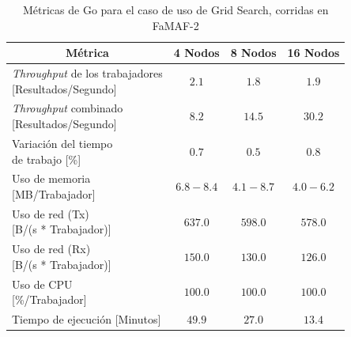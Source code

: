 \documentclass[11pt]{article}
\providecommand{\row}[1]{\parbox{150pt}{\setlength{\baselineskip}{0.2\baselineskip}\strut#1\strut}}
\newcommand{\gscap}[2]{\caption{Métricas de #1 para el caso de uso de Grid Search, corridas en #2}}
\newcommand{\english}[1]{\textit{#1}}
\begin{document}
\begin{table}[H]
\centering
\begin{tabular}{|l|c|c|c|}
\hline
\multicolumn{1}{|c|}{Métrica} & 4 Nodos & 8 Nodos & 16 Nodos \\ \hline
\row{\english{Throughput} de los trabajadores\\{[Resultados/Segundo]}} & $2.1$ & $1.8$ & $1.9$ \\ \hline
\row{\english{Throughput} combinado\\{[Resultados/Segundo]}} & $8.2$ & $14.5$ & $30.2$ \\ \hline
\row{Variación del tiempo\\de trabajo {[\%]}} & $0.7$ & $0.5$ & $0.8$ \\ \hline
\row{Uso de memoria\\{[MB/Trabajador]}} & $6.8-8.4$ & $4.1-8.7$ & $4.0-6.2$ \\ \hline
\row{Uso de red (Tx)\\{[B/(s * Trabajador)]}} & $637.0$ & $598.0$ & $578.0$ \\ \hline
\row{Uso de red (Rx)\\{[B/(s * Trabajador)]}} & $150.0$ & $130.0$ & $126.0$ \\ \hline
\row{Uso de CPU\\{[\%/Trabajador]}} & $100.0$ & $100.0$ & $100.0$ \\ \hline
Tiempo de ejecución [Minutos] & $49.9$ & $27.0$ & $13.4$ \\ \hline
\end{tabular}
\gscap{Go}{FaMAF-2}
\end{table}
\end{document}
